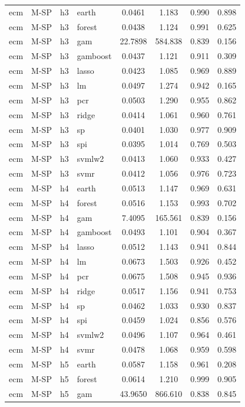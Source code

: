 \begin{ThreePartTable}
\begin{longtable}[t]{llclcccc}
ecm & M-SP & h3 & earth & 0.0461 & 1.183 & 0.990 & 0.898\\
ecm & M-SP & h3 & forest & 0.0438 & 1.124 & 0.991 & 0.625\\
ecm & M-SP & h3 & gam & 22.7898 & 584.838 & 0.839 & 0.156\\
ecm & M-SP & h3 & gamboost & 0.0437 & 1.121 & 0.911 & 0.309\\
ecm & M-SP & h3 & lasso & 0.0423 & 1.085 & 0.969 & 0.889\\
ecm & M-SP & h3 & lm & 0.0497 & 1.274 & 0.942 & 0.165\\
ecm & M-SP & h3 & pcr & 0.0503 & 1.290 & 0.955 & 0.862\\
ecm & M-SP & h3 & ridge & 0.0414 & 1.061 & 0.960 & 0.761\\
ecm & M-SP & h3 & sp & 0.0401 & 1.030 & 0.977 & 0.909\\
ecm & M-SP & h3 & spi & 0.0395 & 1.014 & 0.769 & 0.503\\
ecm & M-SP & h3 & svmlw2 & 0.0413 & 1.060 & 0.933 & 0.427\\
ecm & M-SP & h3 & svmr & 0.0412 & 1.056 & 0.976 & 0.723\\
\addlinespace
ecm & M-SP & h4 & earth & 0.0513 & 1.147 & 0.969 & 0.631\\
ecm & M-SP & h4 & forest & 0.0516 & 1.153 & 0.993 & 0.702\\
ecm & M-SP & h4 & gam & 7.4095 & 165.561 & 0.839 & 0.156\\
ecm & M-SP & h4 & gamboost & 0.0493 & 1.101 & 0.904 & 0.367\\
ecm & M-SP & h4 & lasso & 0.0512 & 1.143 & 0.941 & 0.844\\
ecm & M-SP & h4 & lm & 0.0673 & 1.503 & 0.926 & 0.452\\
ecm & M-SP & h4 & pcr & 0.0675 & 1.508 & 0.945 & 0.936\\
ecm & M-SP & h4 & ridge & 0.0517 & 1.156 & 0.941 & 0.753\\
ecm & M-SP & h4 & sp & 0.0462 & 1.033 & 0.930 & 0.837\\
ecm & M-SP & h4 & spi & 0.0459 & 1.024 & 0.856 & 0.576\\
ecm & M-SP & h4 & svmlw2 & 0.0496 & 1.107 & 0.964 & 0.461\\
ecm & M-SP & h4 & svmr & 0.0478 & 1.068 & 0.959 & 0.598\\
\addlinespace
ecm & M-SP & h5 & earth & 0.0587 & 1.158 & 0.961 & 0.208\\
ecm & M-SP & h5 & forest & 0.0614 & 1.210 & 0.999 & 0.905\\
ecm & M-SP & h5 & gam & 43.9650 & 866.610 & 0.838 & 0.845\\

\end{longtable}
\end{ThreePartTable}
